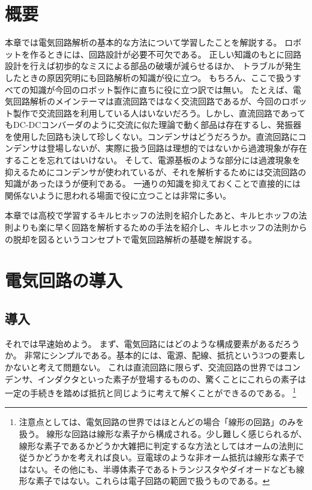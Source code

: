 \documentclass{ltjsreport}
\begin{document}
\section{概要}
本章では電気回路解析の基本的な方法について学習したことを解説する。
ロボットを作るときには、回路設計が必要不可欠である。
正しい知識のもとに回路設計を行えば初歩的なミスによる部品の破壊が減らせるほか、
トラブルが発生したときの原因究明にも回路解析の知識が役に立つ。
もちろん、ここで扱うすべての知識が今回のロボット製作に直ちに役に立つ訳では無い。
たとえば、電気回路解析のメインテーマは直流回路ではなく交流回路であるが、今回のロボット製作で交流回路を利用している人はいないだろう。しかし、直流回路であってもDC-DCコンバーダのように交流に似た理論で動く部品は存在するし、発振器を使用した回路も決して珍しくない。コンデンサはどうだろうか。直流回路にコンデンサは登場しないが、実際に扱う回路は理想的ではないから過渡現象が存在することを忘れてはいけない。
そして、電源基板のような部分には過渡現象を抑えるためにコンデンサが使われているが、それを解析するためには交流回路の知識があったほうが便利である。
一通りの知識を抑えておくことで直接的には関係ないように思われる場面で役に立つことは非常に多い。

本章では高校で学習するキルヒホッフの法則を紹介したあと、キルヒホッフの法則よりも楽に早く回路を解析するための手法を紹介し、キルヒホッフの法則からの脱却を図るというコンセプトで電気回路解析の基礎を解説する。

\section{電気回路の導入}
\subsection{導入}
それでは早速始めよう。
まず、電気回路にはどのような構成要素があるだろうか。
非常にシンプルである。基本的には、電源、配線、抵抗という3つの要素しかないと考えて問題ない。
これは直流回路に限らず、交流回路の世界ではコンデンサ、インダクタといった素子が登場するものの、驚くことにこれらの素子は一定の手続きを踏めば抵抗と同じように考えて解くことができるのである。
\footnote{注意点としては、電気回路の世界ではほとんどの場合「線形の回路」のみを扱う。
線形な回路は線形な素子から構成される。少し難しく感じられるが、線形な素子であるかどうか大雑把に判定するな方法としてはオームの法則に従うかどうかを考えれば良い。豆電球のような非オーム抵抗は線形な素子ではない。その他にも、半導体素子であるトランジスタやダイオードなども線形な素子ではない。これらは電子回路の範囲で扱うものである。}
\end{document}
